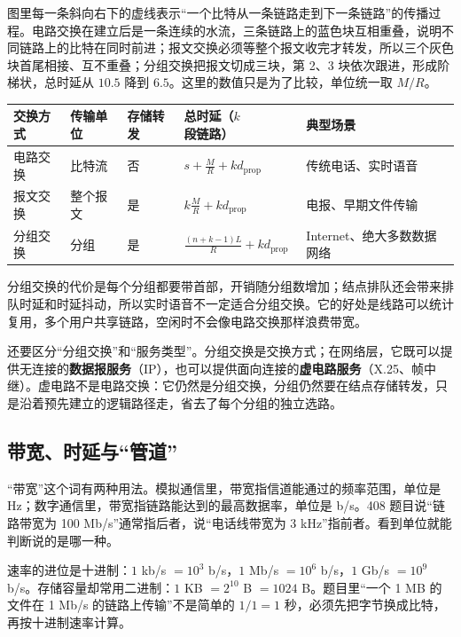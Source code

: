 图里每一条斜向右下的虚线表示“一个比特从一条链路走到下一条链路”的传播过程。电路交换在建立后是一条连续的水流，三条链路上的蓝色块互相重叠，说明不同链路上的比特在同时前进；报文交换必须等整个报文收完才转发，所以三个灰色块首尾相接、互不重叠；分组交换把报文切成三块，第 2、3 块依次跟进，形成阶梯状，总时延从 $10.5$ 降到 $6.5$。这里的数值只是为了比较，单位统一取 $M/R$。

\begin{center}
\begin{tabularx}{\linewidth}{|p{1.7cm}|p{2.1cm}|p{2.1cm}|p{4.2cm}|X|}
\hline
交换方式 & 传输单位 & 存储转发 & 总时延（$k$ 段链路） & 典型场景 \\
\hline
电路交换 & 比特流 & 否 & $s+\frac{M}{R}+k d_{\mathrm{prop}}$ & 传统电话、实时语音 \\
\hline
报文交换 & 整个报文 & 是 & $k\frac{M}{R}+k d_{\mathrm{prop}}$ & 电报、早期文件传输 \\
\hline
分组交换 & 分组 & 是 & $\frac{(n+k-1)L}{R}+k d_{\mathrm{prop}}$ & Internet、绝大多数数据网络 \\
\hline
\end{tabularx}
\end{center}

分组交换的代价是每个分组都要带首部，开销随分组数增加；结点排队还会带来排队时延和时延抖动，所以实时语音不一定适合分组交换。它的好处是线路可以统计复用，多个用户共享链路，空闲时不会像电路交换那样浪费带宽。

还要区分“分组交换”和“服务类型”。分组交换是交换方式；在网络层，它既可以提供无连接的\textbf{数据报服务}（IP），也可以提供面向连接的\textbf{虚电路服务}（X.25、帧中继）。虚电路不是电路交换：它仍然是分组交换，分组仍然要在结点存储转发，只是沿着预先建立的逻辑路径走，省去了每个分组的独立选路。

\subsection{带宽、时延与“管道”}

“带宽”这个词有两种用法。模拟通信里，带宽指信道能通过的频率范围，单位是 Hz；数字通信里，带宽指链路能达到的最高数据率，单位是 b/s。408 题目说“链路带宽为 100 Mb/s”通常指后者，说“电话线带宽为 3 kHz”指前者。看到单位就能判断说的是哪一种。

速率的进位是十进制：$1$ kb/s $=10^3$ b/s，$1$ Mb/s $=10^6$ b/s，$1$ Gb/s $=10^9$ b/s。存储容量却常用二进制：$1$ KB $=2^{10}$ B $=1024$ B。题目里“一个 1 MB 的文件在 1 Mb/s 的链路上传输”不是简单的 $1/1=1$ 秒，必须先把字节换成比特，再按十进制速率计算。

